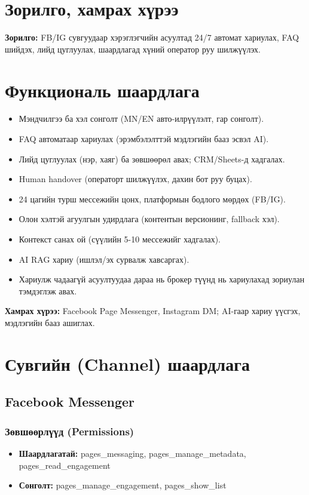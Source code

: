 \documentclass[12pt,A4]{report}
\begin{document}
\section{Зорилго, хамрах хүрээ}

\textbf{Зорилго:} FB/IG сувгуудаар хэрэглэгчийн асуултад 24/7 автомат хариулах, FAQ шийдэх, лийд цуглуулах, шаардлагад хүний оператор руу шилжүүлэх.

\section{Функциональ шаардлага}
\begin{itemize}
  \item Мэндчилгээ ба хэл сонголт (MN/EN авто-илрүүлэлт, гар сонголт).
  \item FAQ автоматаар хариулах (эрэмбэлэлттэй мэдлэгийн бааз эсвэл AI).
  \item Лийд цуглуулах (нэр, хаяг) ба зөвшөөрөл авах; CRM/Sheets-д хадгалах.
  \item Human handover (операторт шилжүүлэх, дахин бот руу буцах).
  \item 24 цагийн турш мессежийн цонх, платформын бодлого мөрдөх (FB/IG).
  \item Олон хэлтэй агуулгын удирдлага (контентын версионинг, fallback хэл).
  \item Контекст санах ой (сүүлийн 5-10 мессежийг хадгалах).
  \item AI RAG хариу (ишлэл/эх сурвалж хавсаргах).
  \item Хариулж чадаагүй асуултуудаа дараа нь брокер түүнд нь хариулахад зориулан тэмдэглэж авах.
\end{itemize}

\textbf{Хамрах хүрээ:} Facebook Page Messenger, Instagram DM; AI-гаар хариу үүсгэх, мэдлэгийн бааз ашиглах.

\section{Сувгийн (Channel) шаардлага}

\subsection{Facebook Messenger}

\subsubsection{Зөвшөөрлүүд (Permissions)}
\begin{itemize}
    \item \textbf{Шаардлагатай:} pages\_messaging, pages\_manage\_metadata, pages\_read\_engagement
    \item \textbf{Сонголт:} pages\_manage\_engagement, pages\_show\_list
\end{itemize}
\end{document}
